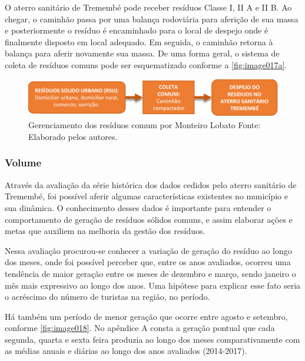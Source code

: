 O aterro sanitário de Tremembé pode receber resíduos Classe I, II A e II B. Ao chegar, o caminhão passa por uma balança rodoviária para aferição de sua massa e posteriormente o resíduo é encaminhado para o local de despejo onde é finalmente disposto em local adequado. Em seguida, o caminhão retorna à balança para aferir novamente sua massa.
De uma forma geral, o sistema de coleta de resíduos comuns pode ser esquematizado conforme a \autoref{fig:image017a}.

\begin{figure}
	\centering
	\includegraphics[width=0.75\linewidth]{produtos/prodtres/image017a}
	\caption{Gerenciamento dos resíduos comum por Monteiro Lobato Fonte: Elaborado pelos autores.}
	\label{fig:image017a}
\end{figure}

\subsubsection{Volume}

Através da avaliação da série histórica dos dados cedidos pelo aterro sanitário de Tremembé, foi possível aferir algumas características existentes no município e sua dinâmica. O conhecimento desses dados é importante para entender o comportamento de geração de resíduos sólidos comuns, e assim elaborar ações e metas que auxiliem na melhoria da gestão dos resíduos.

Nessa avaliação procurou-se conhecer a variação de geração do resíduo ao longo dos meses, onde foi possível perceber que, entre os anos avaliados, ocorreu uma tendência de maior geração entre os meses de dezembro e março, sendo janeiro o mês mais expressivo ao longo dos anos. Uma hipótese para explicar esse fato seria o acréscimo do número de turistas na região, no período.

Há também um período de menor geração que ocorre entre agosto e setembro, conforme \autoref{fig:image018}. No apêndice A consta a geração pontual que cada segunda, quarta e sexta feira produzia ao longo dos meses comparativamente com as médias anuais e diárias ao longo dos anos avaliados (2014-2017).

